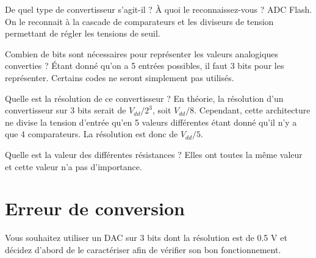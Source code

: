 \documentclass{exam}
\begin{document}
\clearpage
{}
{
	De quel type de convertisseur s'agit-il ?
	À quoi le reconnaissez-vous ?
}
{
	ADC Flash. On le reconnait à la cascade de comparateurs et les diviseurs de tension permettant de régler les tensions de seuil.
}

{
	Combien de bits sont nécessaires pour représenter les valeurs analogiques converties ?
}
{
	Étant donné qu'on a 5 entrées possibles, il faut 3 bits pour les représenter. Certains codes ne seront simplement pas utilisés.
}

{
	Quelle est la résolution de ce convertisseur ?
}
{
	En théorie, la résolution d'un convertisseur sur 3 bits serait de $V_{dd}/2^3$, soit $V_{dd}/8$.
	Cependant, cette architecture ne divise la tension d'entrée qu'en 5 valeurs différentes étant donné qu'il n'y a que 4 comparateurs. La résolution est donc de $V_{dd}/5$.
}

{
	Quelle est la valeur des différentes résistances ?
}
{
	Elles ont toutes la même valeur et cette valeur n'a pas d'importance.
}

\clearpage




\section{Erreur de conversion}
Vous souhaitez utiliser un DAC sur 3 bits dont la résolution est de 0.5 V et décidez d'abord de le caractériser afin de vérifier son bon fonctionnement.
\end{document}
